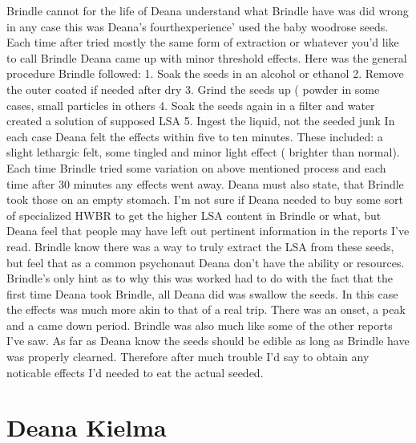 \documentclass[12pt]{book}
\begin{document}
Brindle cannot for the life of Deana understand what Brindle have was did wrong in any case this was Deana's fourthexperience' used the baby woodrose seeds. Each time after tried mostly the same form of extraction or whatever you'd like to call Brindle Deana came up with minor threshold effects. Here was the general procedure Brindle followed: 1. Soak the seeds in an alcohol or ethanol 2. Remove the outer coated if needed after dry 3. Grind the seeds up ( powder in some cases, small particles in others 4. Soak the seeds again in a filter and water created a solution of supposed LSA 5. Ingest the liquid, not the seeded junk In each case Deana felt the effects within five to ten minutes. These included: a slight lethargic felt, some tingled and minor light effect ( brighter than normal). Each time Brindle tried some variation on above mentioned process and each time after 30 minutes any effects went away. Deana must also state, that Brindle took those on an empty stomach. I'm not sure if Deana needed to buy some sort of specialized HWBR to get the higher LSA content in Brindle or what, but Deana feel that people may have left out pertinent information in the reports I've read. Brindle know there was a way to truly extract the LSA from these seeds, but feel that as a common psychonaut Deana don't have the ability or resources. Brindle's only hint as to why this was worked had to do with the fact that the first time Deana took Brindle, all Deana did was swallow the seeds. In this case the effects was much more akin to that of a real trip. There was an onset, a peak and a came down period. Brindle was also much like some of the other reports I've saw. As far as Deana know the seeds should be edible as long as Brindle have was properly clearned. Therefore after much trouble I'd say to obtain any noticable effects I'd needed to eat the actual seeded.



\chapter{Deana Kielma}
\end{document}
